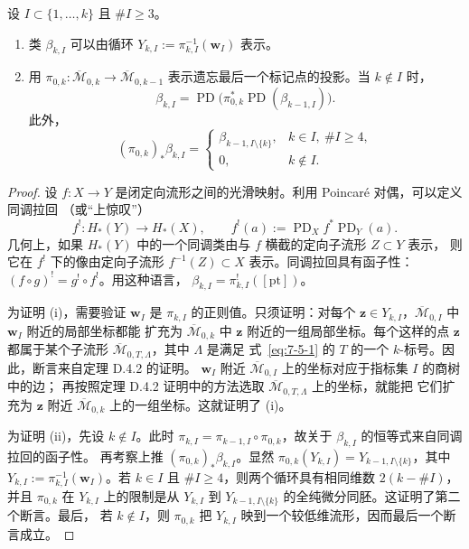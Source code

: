\begin{lemma}\label{lem:7-5-5}
设 $I\subset\{1,\ldots,k\}$ 且 $\#I\ge3$。
\begin{enumerate}[label=\textup{(\roman*)},leftmargin=3em]
\item 类 $\beta_{k,I}$ 可以由循环
$Y_{k,I}:=\pi_{k,I}^{-1}(\mathbf w_I)$ 表示。
\item 用 $\pi_{0,k}:\overline{\mathcal M}_{0,k}\to
\overline{\mathcal M}_{0,k-1}$ 表示遗忘最后一个标记点的投影。当 $k\notin I$ 时，
\[
  \beta_{k,I}
  =\operatorname{PD}\bigl(\pi_{0,k}^*\operatorname{PD}(\beta_{k-1,I})\bigr).
\]
此外，
\[
  (\pi_{0,k})_*\beta_{k,I}
  =\begin{cases}
    \beta_{k-1,I\setminus\{k\}},&k\in I,\ \#I\ge4,\\
    0,&k\notin I.
  \end{cases}
\]
\end{enumerate}
\end{lemma}

\begin{proof}
设 $f:X\to Y$ 是闭定向流形之间的光滑映射。利用 Poincaré 对偶，可以定义同调拉回
（或“上惊叹”）
\[
  f^!:H_*(Y)\longrightarrow H_*(X),
  \qquad f^!(a):=\operatorname{PD}_Xf^*\operatorname{PD}_Y(a).
\]
几何上，如果 $H_*(Y)$ 中的一个同调类由与 $f$ 横截的定向子流形 $Z\subset Y$ 表示，
则它在 $f^!$ 下的像由定向子流形 $f^{-1}(Z)\subset X$ 表示。同调拉回具有函子性：
$(f\circ g)^!=g^!\circ f^!$。用这种语言，
$\beta_{k,I}=\pi_{k,I}^!([\mathrm{pt}])$。

为证明 (i)，需要验证 $\mathbf w_I$ 是 $\pi_{k,I}$ 的正则值。只须证明：对每个
$\mathbf z\in Y_{k,I}$，$\overline{\mathcal M}_{0,I}$ 中 $\mathbf w_I$ 附近的局部坐标都能
扩充为 $\overline{\mathcal M}_{0,k}$ 中 $\mathbf z$ 附近的一组局部坐标。每个这样的点
$\mathbf z$ 都属于某个子流形 $\overline{\mathcal M}_{0,T,\Lambda}$，其中 $\Lambda$ 是满足
式~\eqref{eq:7-5-1} 的 $T$ 的一个 $k$-标号。因此，断言来自定理 D.4.2 的证明。
$\mathbf w_I$ 附近 $\overline{\mathcal M}_{0,I}$ 上的坐标对应于指标集 $I$ 的商树中的边；
再按照定理 D.4.2 证明中的方法选取 $\overline{\mathcal M}_{0,T,\Lambda}$ 上的坐标，就能把
它们扩充为 $\mathbf z$ 附近 $\overline{\mathcal M}_{0,k}$ 上的一组坐标。这就证明了 (i)。

为证明 (ii)，先设 $k\notin I$。此时
$\pi_{k,I}=\pi_{k-1,I}\circ\pi_{0,k}$，故关于 $\beta_{k,I}$ 的恒等式来自同调拉回的函子性。
再考察上推 $(\pi_{0,k})_*\beta_{k,I}$。显然
$\pi_{0,k}(Y_{k,I})=Y_{k-1,I\setminus\{k\}}$，其中
$Y_{k,I}:=\pi_{k,I}^{-1}(\mathbf w_I)$。若 $k\in I$ 且 $\#I\ge4$，则两个循环具有相同维数
$2(k-\#I)$，并且 $\pi_{0,k}$ 在 $Y_{k,I}$ 上的限制是从 $Y_{k,I}$ 到
$Y_{k-1,I\setminus\{k\}}$ 的全纯微分同胚。这证明了第二个断言。最后，
若 $k\notin I$，则 $\pi_{0,k}$ 把 $Y_{k,I}$ 映到一个较低维流形，因而最后一个断言成立。
\end{proof}

